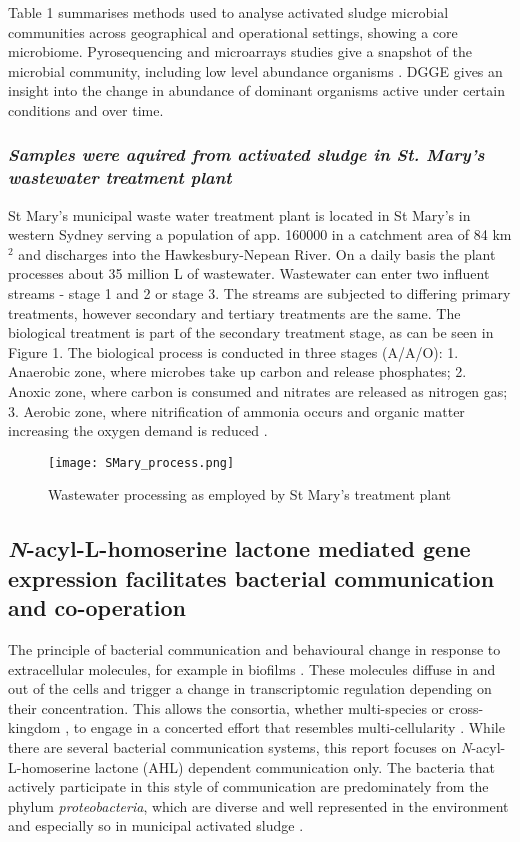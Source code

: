 \documentclass{article}
\begin{document}
Table 1 summarises methods used to analyse activated sludge microbial communities across geographical and operational settings, showing a core microbiome. Pyrosequencing and microarrays studies give a snapshot of the microbial community, including low level abundance organisms \cite{ranasinghe2012revealing}. DGGE gives an insight into the change in abundance of dominant organisms active under certain conditions and over time. 

\subsubsection{\emph{Samples were aquired from activated sludge in St. Mary's wastewater treatment plant}}
St Mary's municipal waste water treatment plant is located in St Mary's in western Sydney serving a population of app. 160000 in a catchment area of 84 km$^{2}$ and discharges into the Hawkesbury-Nepean River. On a daily basis the plant processes about 35 million L of wastewater. Wastewater can enter two influent streams - stage 1 and 2 or stage 3. The streams are subjected to differing primary treatments, however secondary and tertiary treatments are the same. The biological treatment is part of the secondary treatment stage, as can be seen in Figure 1. The biological process is conducted in three stages (A/A/O): 1. Anaerobic zone, where microbes take up carbon and release phosphates; 2. Anoxic zone, where carbon is consumed and nitrates are released as nitrogen gas; 3. Aerobic zone, where nitrification of ammonia occurs and organic matter increasing the oxygen demand is reduced \cite{stmarys}.
\begin{figure}
\texttt{[image: SMary\_process.png]}
\caption{Wastewater processing as employed by St Mary's treatment plant \cite{stmarys}}
\end{figure}

\subsection{\emph{N}-acyl-L-homoserine lactone mediated gene expression facilitates bacterial communication and co-operation}
The principle of bacterial communication and behavioural change in response to extracellular molecules, for example in biofilms \cite{webb2003}. These molecules diffuse in and out of the cells and trigger a change in transcriptomic regulation depending on their concentration. This allows the consortia, whether multi-species or cross-kingdom \citep{williams2007quorum}, to engage in a concerted effort that resembles multi-cellularity \cite{kjelleberg2002}. While there are several bacterial communication systems, this report focuses on \emph{N}-acyl-L-homoserine lactone (AHL) dependent communication only. The bacteria that actively participate in this style of communication are predominately from the phylum \emph{proteobacteria}, which are diverse and well represented in the environment and especially so in municipal activated sludge \cite{Hesham_11,Wagner_02}.  
\end{document}
